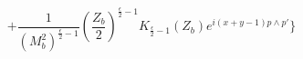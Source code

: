 \begin{equation}
+\frac{1}{(M^{2}_{b})^{\frac{\epsilon}{2}-1}}
\left(\frac{Z_{b}}{2}\right)^{\frac{\epsilon}{2}-1}K_{\frac{\epsilon}{2}-1}(Z_{b})e^{i(x+y-1)p\wedge
p'}\biggr\}
 \end{equation}\
